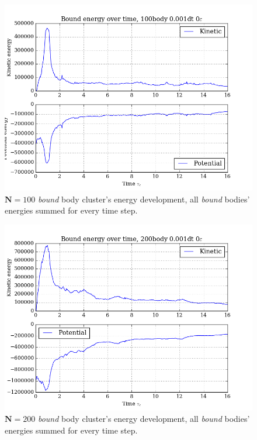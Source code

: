 \documentclass[11pt,a4paper,notitlepage,twocolumn]{article}
\begin{document}
\begin{figure}
[H]\center
\includegraphics[scale=0.35]{../figs/ClusterEnergiesComp_100body_dt1_eps0_dur16.png}
\caption{$\mathbf{N} = 100$ \textit{bound} body cluster's energy development, all \textit{bound} bodies' energies summed for every time step.}
\end{figure}
\begin{figure}
[H]\center
\includegraphics[scale=0.35]{../figs/ClusterEnergiesComp_200body_dt1_eps0_dur16.png}
\caption{$\mathbf{N} = 200$ \textit{bound} body cluster's energy development, all \textit{bound} bodies' energies summed for every time step.}
\end{figure}
\end{document}
